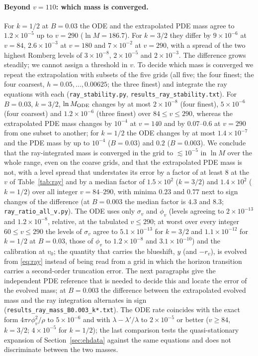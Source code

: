 \documentclass[11pt]{article}
\begin{document}
\paragraph{Beyond $v=110$: which mass is converged.} For $k=1/2$ at $B=0.03$ the ODE and the extrapolated PDE mass agree to $1.2\times10^{-5}$ up to $v=290$ ($\ln M=186.7$). For $k=3/2$ they differ by $9\times10^{-6}$ at $v=84$, $2.6\times10^{-3}$ at $v=180$ and $7\times10^{-2}$ at $v=290$, with a spread of the two highest Romberg levels of $3\times10^{-8}$, $2\times10^{-5}$ and $2\times10^{-3}$. The difference grows steadily; we cannot assign a threshold in $v$. To decide which mass is converged we repeat the extrapolation with subsets of the five grids (all five; the four finest; the four coarsest, $h=0.05,\dots,0.00625$; the three finest) and integrate the ray equations with each (\texttt{ray\_stability.py}, \texttt{results\_ray\_stability.txt}). For $B=0.03$, $k=3/2$, $\ln M_{\rm ODE}$ changes by at most $2\times10^{-8}$ (four finest), $5\times10^{-6}$ (four coarsest) and $1.2\times10^{-6}$ (three finest) over $84\le v\le290$, whereas the extrapolated PDE mass changes by $10^{-4}$ at $v=140$ and by $0.07$--$0.6$ at $v=290$ from one subset to another; for $k=1/2$ the ODE changes by at most $1.4\times10^{-7}$ and the PDE mass by up to $10^{-4}$ ($B=0.03$) and $0.2$ ($B=0.003$). We conclude that the ray-integrated mass is converged in the grid to $\lesssim10^{-5}$ in $\ln M$ over the whole range, even on the coarse grids, and that the extrapolated PDE mass is not, with a level spread that understates its error by a factor of at least $8$ at the $v$ of Table~\ref{tab:ray} and by a median factor of $1.5\times10^{2}$ ($k=3/2$) and $1.4\times10^{2}$ ($k=1/2$) over all integer $v=84$--$290$, with minima $0.23$ and $0.77$ next to sign changes of the difference (at $B=0.003$ the median factor is $4.3$ and $8.3$; \texttt{ray\_ratio\_all\_v.py}). The ODE uses only $\sigma_v$ and $\phi_v$ (levels agreeing to $2\times10^{-13}$ and $1.2\times10^{-8}$, relative, at the tabulated $v\le290$; at worst over every integer $60\le v\le290$ the levels of $\sigma_v$ agree to $5.1\times10^{-13}$ for $k=3/2$ and $1.1\times10^{-12}$ for $k=1/2$ at $B=0.03$, those of $\phi_v$ to $1.2\times10^{-8}$ and $3.1\times10^{-10}$) and the calibration at $v_0$; the quantity that carries the blueshift, $y$ (and $-r_v$), is evolved from \eqref{eq:ray} instead of being read from a grid in which the horizon transition carries a second-order truncation error. The next paragraphs give the independent PDE reference that is needed to decide this and locate the error of the evolved mass; at $B=0.003$ the difference between the extrapolated evolved mass and the ray integration alternates in sign (\texttt{results\_ray\_mass\_B0.003\_k*.txt}). The ODE rate coincides with the exact form $4\pi r\phi_v^2/\rho$ to $5\times10^{-6}$ and with $\lambda-\lambda'/\lambda$ to $2\times10^{-5}$ or better ($v\ge84$, $k=3/2$; $4\times10^{-5}$ for $k=1/2$); the last comparison tests the quasi-stationary expansion of Section~\ref{sec:ehdata} against the same equations and does not discriminate between the two masses.
\end{document}
